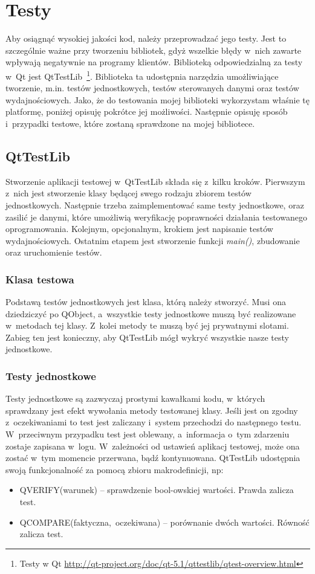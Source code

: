 \chapter{Testy}
Aby osiągnąć wysokiej jakości kod, należy przeprowadzać jego testy. Jest to szczególnie ważne przy tworzeniu bibliotek, gdyż wszelkie błędy w~nich zawarte wpływają negatywnie na programy klientów.
Biblioteką odpowiedzialną za testy w~Qt jest QtTestLib~\footnote{Testy w Qt \url{http://qt-project.org/doc/qt-5.1/qttestlib/qtest-overview.html}}. Biblioteka ta udostępnia narzędzia umożliwiające tworzenie, m.in. testów jednostkowych, testów sterowanych danymi oraz testów wydajnościowych. Jako, że do testowania mojej biblioteki wykorzystam właśnie tę platformę, poniżej opisuję pokrótce jej możliwości. Następnie opisuję sposób i~przypadki testowe, które zostaną sprawdzone na mojej bibliotece.

\section{QtTestLib}
Stworzenie aplikacji testowej w~QtTestLib składa się z~kilku kroków. Pierwszym z~nich jest stworzenie klasy będącej swego rodzaju zbiorem testów jednostkowych. Następnie trzeba zaimplementować same testy jednostkowe, oraz zasilić je danymi, które umożliwią weryfikację poprawności działania testowanego oprogramowania. Kolejnym, opcjonalnym, krokiem jest napisanie testów wydajnościowych. Ostatnim etapem jest stworzenie funkcji \textit{main()}, zbudowanie oraz uruchomienie testów.

\subsection{Klasa testowa}
Podstawą testów jednostkowych jest klasa, którą należy stworzyć. Musi ona dziedziczyć po QObject, a~wszystkie testy jednostkowe muszą być realizowane w~metodach tej klasy. Z~kolei metody te muszą być jej prywatnymi slotami. Zabieg ten jest konieczny, aby QtTestLib mógł wykryć wszystkie nasze testy jednostkowe.


\subsection{Testy jednostkowe}
Testy jednostkowe są zazwyczaj prostymi kawałkami kodu, w~których sprawdzany jest efekt wywołania metody testowanej klasy. Jeśli jest on zgodny z~oczekiwaniami to test jest zaliczany i~system przechodzi do następnego testu. W~przeciwnym przypadku test jest oblewany, a~informacja o~tym zdarzeniu zostaje zapisana w~logu. W~zależności od ustawień aplikacj testowej, może ona zostać w~tym momencie przerwana, bądź kontynuowana. 
QtTestLib udostępnia swoją funkcjonalność za pomocą zbioru makrodefinicji, np:
\begin{itemize}
\item{QVERIFY(warunek) -- sprawdzenie bool-owskiej wartości. Prawda zalicza test.}
\item{QCOMPARE(faktyczna,~oczekiwana) -- porównanie dwóch wartości. Równość zalicza test.}
\end{itemize}


